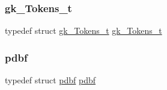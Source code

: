 \subsubsection{\texorpdfstring{gk\+\_\+\+Tokens\+\_\+t}{gk\_Tokens\_t}}
{\footnotesize\ttfamily typedef struct \hyperlink{a00654}{gk\+\_\+\+Tokens\+\_\+t}  \hyperlink{a00654}{gk\+\_\+\+Tokens\+\_\+t}}

\mbox{\label{a00080_a8ca66dd1e15a4372a231b09f6302d8ef}} 
\subsubsection{\texorpdfstring{pdbf}{pdbf}}
{\footnotesize\ttfamily typedef struct \hyperlink{a00666}{pdbf}  \hyperlink{a00666}{pdbf}}


